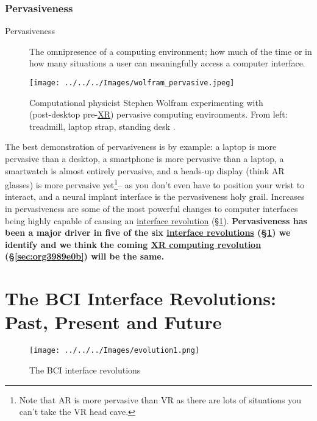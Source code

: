 \documentclass[logo,bsc,singlespacing,parskip]{infthesis}
\begin{document}
\subsection{Pervasiveness}
\label{sec:org0b98dc9}
\medskip
\begin{mdframed}
\begin{description}
\item[{Pervasiveness\label{pervasiveness}}] The omnipresence of a computing environment; how much of the time or in how many situations a user can meaningfully access a computer interface.
\end{description}
\end{mdframed}

\begin{figure}[H]
\centering
\texttt{[image: ../../../Images/wolfram\_pervasive.jpeg]}
\caption[Stephen Wolfram experimenting with pervasive computing]{Computational physicist Stephen Wolfram experimenting with (post-desktop pre-\hyperref[orgf7f8e78]{XR}) pervasive computing environments. From left: treadmill, laptop strap, standing desk \autocite{SeekingProductiveLife}.}
\end{figure}

The best demonstration of pervasiveness is by example: a laptop is more pervasive than a desktop, a smartphone is more pervasive than a laptop, a smartwatch is almost entirely pervasive, and a heads-up display (think AR glasses) is more pervasive yet\footnote{Note that AR is more pervasive than VR as there are lots of situations you can't take the VR head cave.}-- as you don't even have to position your wrist to interact, and a neural implant interface is the pervasiveness holy grail.
Increases in pervasiveness are some of the most powerful changes to computer interfaces being highly capable of causing an \hyperref[sec:orgac8b15e]{interface revolution} (\S \ref{sec:orgac8b15e}).
\textbf{Pervasiveness has been a major driver in five of the six \hyperref[sec:orgac8b15e]{interface revolutions} (\S \ref{sec:orgac8b15e}) we identify and we think the coming \hyperref[sec:org3989e0b]{XR computing revolution} (\S \ref{sec:org3989e0b}) will be the same.}

\chapter{The BCI Interface Revolutions: Past, Present and Future}
\label{sec:orgac8b15e}
\setcounter{section}{-1}
\begin{figure}[h]
\centering
\texttt{[image: ../../../Images/evolution1.png]}
\caption{The BCI interface revolutions}
\end{figure}
\end{document}
